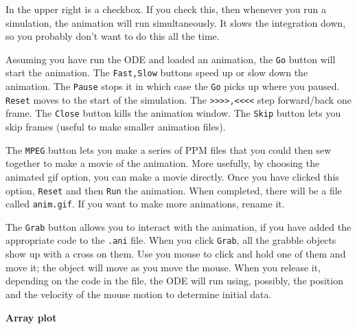 \documentclass{article}
\begin{document}
In the upper right is a checkbox. If you check this, then whenever you run a simulation, the animation will run simultaneously. It slows the integration down, so you probably don't want to do this all the time.

 Assuming you have run the ODE and loaded an animation, the {\tt Go} button will start the animation. The {\tt Fast,Slow} buttons speed up or slow down the animation. The {\tt Pause} stops it in which case the {\tt Go} picks up where you paused. {\tt Reset} moves to the start of the simulation. The {\tt >>>>,<<<<} step forward/back one frame.  The {\tt Close} button kills the animation window.  The {\tt Skip} button lets you skip frames (useful to make smaller animation files).

The {\tt MPEG} button lets you make a series of PPM files that you could then sew together to make a movie of the animation. More usefully, by choosing the animated gif option, you can make a movie directly. Once you have clicked this option, {\tt Reset} and then {\tt Run} the animation. When completed, there will be a file called {\tt anim.gif}. If you want to make more animations, rename it.  

The {\tt Grab} button allows you to interact with the animation, if you have added the appropriate code to the {\tt .ani} file.  When you click {\tt Grab}, all the grabble objects show up with a cross on them. Use you mouse to click and hold one of them and move it; the object will move as you move the mouse. When you release it, depending on the code in the file, the ODE will run using, possibly, the position and the velocity of the mouse motion to determine initial data.    

\bigskip
{\Large \bf Array plot}
\end{document}
